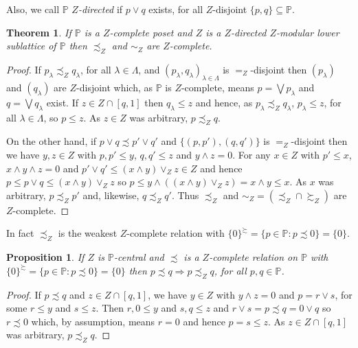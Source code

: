 \documentclass{amsart}
\newtheorem{thm}{Theorem}[section]
\newtheorem{prp}[prp]{Proposition}
\theoremstyle{definition}
\numberwithin{equation}{section}
\begin{document}
Also, we call $\mathbb{P}$ \emph{$Z$-directed} if $p\vee q$ exists, for all $Z$-disjoint $\{p,q\}\subseteq\mathbb{P}$.

\begin{thm}
If $\mathbb{P}$ is a $Z$-complete poset and $Z$ is a $Z$-directed $Z$-modular lower sublattice of $\mathbb{P}$ then $\precsim_Z$ and $\sim_Z$ are $Z$-complete.
\end{thm}

\begin{proof}
If $p_\lambda\precsim_Zq_\lambda$, for all $\lambda\in\Lambda$, and $(p_\lambda,q_\lambda)_{\lambda\in\Lambda}$ is $=_Z$-disjoint then $(p_\lambda)$ and $(q_\lambda)$ are $Z$-disjoint which, as $\mathbb{P}$ is $Z$-complete, means $p=\bigvee p_\lambda$ and $q=\bigvee q_\lambda$ exist.  If $z\in Z\cap[q,1]$ then $q_\lambda\leq z$ and hence, as $p_\lambda\precsim_Zq_\lambda$, $p_\lambda\leq z$, for all $\lambda\in\Lambda$, so $p\leq z$.  As $z\in Z$ was arbitrary, $p\precsim_Zq$.

On the other hand, if $p\vee q\precsim p'\vee q'$ and $\{(p,p'),(q,q')\}$ is $=_Z$-disjoint then we have $y,z\in Z$ with $p,p'\leq y$, $q,q'\leq z$ and $y\wedge z=0$.  For any $x\in Z$ with $p'\leq x$, $x\wedge y\wedge z=0$ and $p'\vee q'\leq(x\wedge y)\vee_Zz\in Z$ and hence $p\leq p\vee q\leq(x\wedge y)\vee_Zz$ so $p\leq y\wedge((x\wedge y)\vee_Zz)=x\wedge y\leq x$.  As $x$ was arbitrary, $p\precsim_Zp'$ and, likewise, $q\precsim_Zq'$.  Thus $\precsim_Z$ and $\sim_Z=(\precsim_Z\cap\succsim_Z)$ are $Z$-complete.
\end{proof}

In fact $\precsim_Z$ is the weakest $Z$-complete relation with $\{0\}^\succsim=\{p\in\mathbb{P}:p\precsim0\}=\{0\}$.

\begin{prp}
If $Z$ is $\mathbb{P}$-central and $\precsim$ is a $Z$-complete relation on $\mathbb{P}$ with $\{0\}^\succsim=\{p\in\mathbb{P}:p\precsim0\}=\{0\}$ then $p\precsim q\Rightarrow p\precsim_Zq$, for all $p,q\in\mathbb{P}$.
\end{prp}

\begin{proof}
If $p\precsim q$ and $z\in Z\cap[q,1]$, we have $y\in Z$ with $y\wedge z=0$ and $p=r\vee s$, for some $r\leq y$ and $s\leq z$.  Then $r,0\leq y$ and $s,q\leq z$ and $r\vee s=p\precsim q=0\vee q$ so $r\precsim0$ which, by assumption, means $r=0$ and hence $p=s\leq z$.  As $z\in Z\cap[q,1]$ was arbitrary, $p\precsim_Zq$.
\end{proof}
\end{document}
